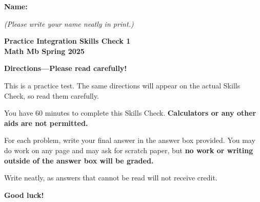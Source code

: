 \documentclass{article}
\begin{document}
 

 \noindent
{\large \mbox{} \hfill \bf Name:\underline{\hspace{2.8in}}}

 {\mbox{} \hfill \it (Please write your name neatly in print.)}


 
\medskip
 
\noindent
{\large\bf
Practice Integration Skills Check 1 \\ Math Mb Spring 2025}
\noindent

{\Large
\begin{center}\textbf{Directions---Please read carefully!} \end{center}}

This is a practice test. The same directions will appear on the actual Skills Check, so read them carefully.

\hrulefill 

You have 60 minutes to complete this Skills Check. \textbf{Calculators or any other aids are not permitted.}  


For each problem, write your final answer in the answer box provided. You may do work on any page and may ask for scratch paper, but \textbf{no work or writing outside of the answer box will be graded.}

Write neatly, as answers that cannot be read will not receive credit. 

   

\begin{center}\textbf{Good luck!}\end{center}
\end{document}
